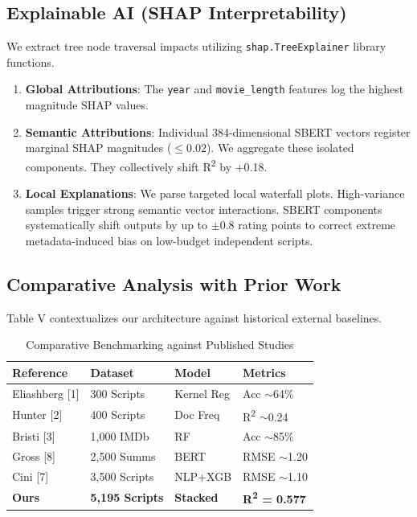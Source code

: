 \documentclass[conference]{IEEEtran}
\begin{document}
\subsection{Explainable AI (SHAP Interpretability)}
We extract tree node traversal impacts utilizing \texttt{shap.TreeExplainer} library functions. 
\begin{enumerate}
\item \textbf{Global Attributions}: The \texttt{year} and \texttt{movie\_length} features log the highest magnitude SHAP values. 
\item \textbf{Semantic Attributions}: Individual 384-dimensional SBERT vectors register marginal SHAP magnitudes ($\le 0.02$). We aggregate these isolated components. They collectively shift R\textsuperscript{2} by +0.18.
\item \textbf{Local Explanations}: We parse targeted local waterfall plots. High-variance samples trigger strong semantic vector interactions. SBERT components systematically shift outputs by up to $\pm$0.8 rating points to correct extreme metadata-induced bias on low-budget independent scripts.
\end{enumerate}

\subsection{Comparative Analysis with Prior Work}
Table V contextualizes our architecture against historical external baselines.

\begin{table}[htbp]
\caption{Comparative Benchmarking against Published Studies}
\begin{center}
\begin{tabular}{|l|l|l|l|}
\hline
\textbf{Reference} & \textbf{Dataset} & \textbf{Model} & \textbf{Metrics} \\
\hline
Eliashberg [1] & 300 Scripts & Kernel Reg & Acc $\sim$64\% \\
\hline
Hunter [2] & 400 Scripts & Doc Freq & R\textsuperscript{2} $\sim$0.24 \\
\hline
Bristi [3] & 1,000 IMDb & RF & Acc $\sim$85\% \\
\hline
Gross [8] & 2,500 Summs & BERT & RMSE $\sim$1.20 \\
\hline
Cini [7] & 3,500 Scripts & NLP+XGB & RMSE $\sim$1.10 \\
\hline
\textbf{Ours} & \textbf{5,195 Scripts} & \textbf{Stacked} & \textbf{R\textsuperscript{2} = 0.577} \\
\hline
\end{tabular}
\label{tab5}
\end{center}
\end{table}
\end{document}
